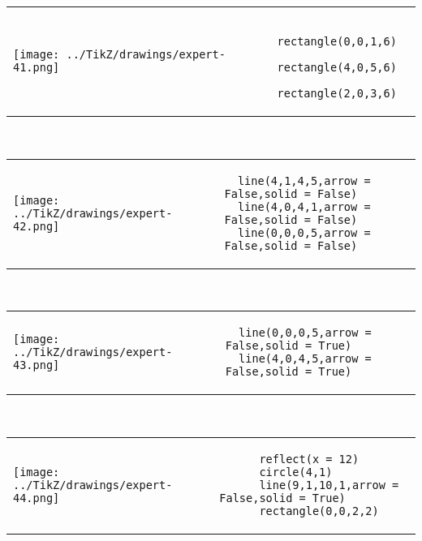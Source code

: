             \begin{tabular}{ll}
    \texttt{[image: ../TikZ/drawings/expert-41.png]}&
    
        \begin{minipage}{10cm}
        \begin{verbatim}
  rectangle(0,0,1,6)
  rectangle(4,0,5,6)
  rectangle(2,0,3,6)
        \end{verbatim}
\end{minipage}

    \end{tabular}        
            \\

            \begin{tabular}{ll}
    \texttt{[image: ../TikZ/drawings/expert-42.png]}&
    
        \begin{minipage}{10cm}
        \begin{verbatim}
  line(4,1,4,5,arrow = False,solid = False)
  line(4,0,4,1,arrow = False,solid = False)
  line(0,0,0,5,arrow = False,solid = False)
        \end{verbatim}
\end{minipage}

    \end{tabular}        
            \\

            \begin{tabular}{ll}
    \texttt{[image: ../TikZ/drawings/expert-43.png]}&
    
        \begin{minipage}{10cm}
        \begin{verbatim}
  line(0,0,0,5,arrow = False,solid = True)
  line(4,0,4,5,arrow = False,solid = True)
        \end{verbatim}
\end{minipage}

    \end{tabular}        
            \\

            \begin{tabular}{ll}
    \texttt{[image: ../TikZ/drawings/expert-44.png]}&
    
        \begin{minipage}{10cm}
        \begin{verbatim}
      reflect(x = 12)
      circle(4,1)
      line(9,1,10,1,arrow = False,solid = True)
      rectangle(0,0,2,2)
        \end{verbatim}
\end{minipage}

    \end{tabular}        
            \\

